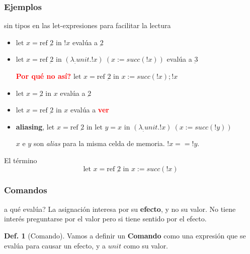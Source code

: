 \documentclass{report}
\theoremstyle{definition} %
\newtheorem{definition}{Def.}[chapter]
\newcommand{\todo}[1]{{\textcolor{red}{\textbf{#1}}}}
\newcommand{\abs}[3]{\lambda #1 : #2 . #3}
\newcommand{\app}[2]{#1 \ #2} %
\newcommand{\suc}[1]{succ(#1)}
\newcommand{\num}[1]{\underbar{#1}} %
\newcommand{\seq}[2]{#1;#2}
\newcommand{\uletin}[3]{\text{let } #1 = #2 \text{ in } #3} %
\newcommand{\alloc}[1]{\text{ref } #1}
\newcommand{\dealloc}[1]{!#1}
\newcommand{\assign}[2]{#1 := #2}
\begin{document}
\subsubsection{Ejemplos}

sin tipos en las let-expresiones para facilitar la lectura

\begin{itemize}
    \item $\uletin{x}{\alloc{\num{2}}}{\dealloc{x}}$ evalúa a  $\num{2}$
    \item \(
        \uletin
            {x}
            {\alloc{\num{2}}}
            {\app
                {(\abs{_}{unit}{\dealloc{x}})}
                {(\assign{x}{\suc{\dealloc{x}}})}
            }
    \) evalúa a $\num{3}$

    \todo{Por qué no así?} \(
        \uletin
            {x}
            {\alloc{\num{2}}}
            {\seq
                {\assign{x}{\suc{\dealloc{x}}}}
                {\dealloc{x}}
            }
    \)
    
    \item $\uletin{x}{\num{2}}{x}$ evalúa a $\num{2}$
    \item $\uletin{x}{\alloc{\num{2}}}{x}$ evalúa a \todo{ver}
    \item \textbf{aliasing},  \(
        \uletin
            {x}
            {\alloc{\num{2}}}
            {
                \uletin{y}{x}
                {
                    \app
                        {(\abs{_}{unit}{\dealloc{x}})}
                        {(\assign{x}{\suc{\dealloc{y}}})}
                }
            }
    \)

    $x$ e $y$ son \textit{alias} para la misma celda de memoria. $\dealloc{x} == 
    \dealloc{y}$.
\end{itemize}

El término
\[
    \uletin
        {x}
        {\alloc{\num{2}}}
        {\assign{x}{\suc{\dealloc{x}}}}
\]

\subsubsection{Comandos}

a qué evalúa? La asignación interesa por su \textbf{efecto}, y no su valor. No
tiene interés preguntarse por el valor pero si tiene sentido por el efecto.

\begin{definition}[Comando]
Vamos a definir un \textbf{Comando} como una expresión que se evalúa para
causar un efecto, y a $unit$ como su valor.
\end{definition}
\end{document}
